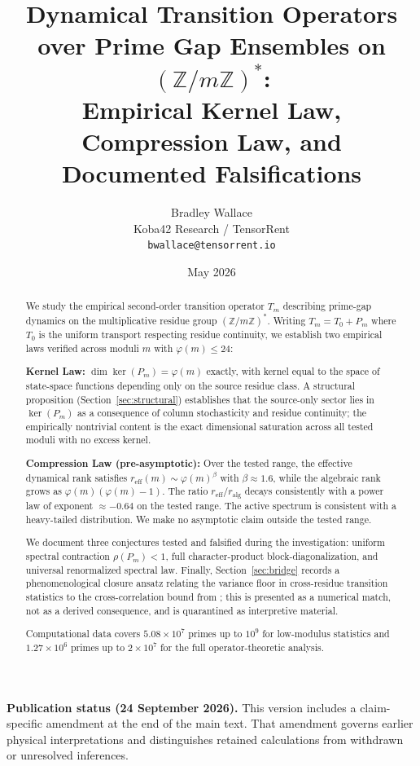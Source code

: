 \documentclass[11pt,a4paper]{article}
\title{Dynamical Transition Operators over Prime Gap Ensembles on $(\mathbb{Z}/m\mathbb{Z})^*$:\\
Empirical Kernel Law, Compression Law, and Documented Falsifications}
\author{Bradley Wallace\\
Koba42 Research / TensorRent\\
\texttt{bwallace@tensorrent.io}}
\date{May 2026}
\begin{document}
\maketitle

\begin{abstract}
We study the empirical second-order transition operator $T_m$ describing prime-gap dynamics on the multiplicative residue group $(\mathbb{Z}/m\mathbb{Z})^*$. Writing $T_m = T_0 + P_m$ where $T_0$ is the uniform transport respecting residue continuity, we establish two empirical laws verified across moduli $m$ with $\varphi(m) \leq 24$:

\textbf{Kernel Law:} $\dim \ker(P_m) = \varphi(m)$ exactly, with kernel equal to the space of state-space functions depending only on the source residue class. A structural proposition (Section~\ref{sec:structural}) establishes that the source-only sector lies in $\ker(P_m)$ as a consequence of column stochasticity and residue continuity; the empirically nontrivial content is the exact dimensional saturation across all tested moduli with no excess kernel.

\textbf{Compression Law (pre-asymptotic):} Over the tested range, the effective dynamical rank satisfies $r_{\text{eff}}(m) \sim \varphi(m)^{\beta}$ with $\beta \approx 1.6$, while the algebraic rank grows as $\varphi(m)(\varphi(m)-1)$. The ratio $r_{\text{eff}}/r_{\text{alg}}$ decays consistently with a power law of exponent $\approx -0.64$ on the tested range. The active spectrum is consistent with a heavy-tailed distribution. We make no asymptotic claim outside the tested range.

We document three conjectures tested and falsified during the investigation: uniform spectral contraction $\rho(P_m) < 1$, full character-product block-diagonalization, and universal renormalized spectral law. Finally, Section~\ref{sec:bridge} records a phenomenological closure ansatz relating the variance floor in cross-residue transition statistics to the cross-correlation bound from \cite{WallaceB}; this is presented as a numerical match, not as a derived consequence, and is quarantined as interpretive material.

Computational data covers $5.08 \times 10^7$ primes up to $10^9$ for low-modulus statistics and $1.27 \times 10^6$ primes up to $2 \times 10^7$ for the full operator-theoretic analysis.
\end{abstract}
\par\smallskip\noindent\textbf{Publication status (24 September 2026).}
This version includes a claim-specific amendment at the end of the main text.
That amendment governs earlier physical interpretations and distinguishes
retained calculations from withdrawn or unresolved inferences.\par\smallskip
\end{document}
